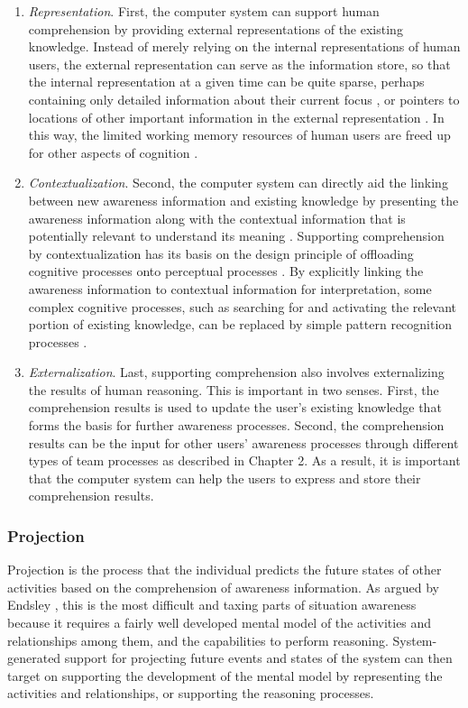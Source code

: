 \begin{enumerate}
	\item \emph{Representation}. First, the computer system can support human comprehension by providing external representations of the existing knowledge. Instead of merely relying on the internal representations of human users, the external representation can serve as the information store, so that the internal representation at a given time can be quite sparse, perhaps containing only detailed information about their current focus \cite{Hegarty2011}, or pointers to locations of other important information in the external representation \cite{M.1996}. In this way, the limited working memory resources of human users are freed up for other aspects of cognition \cite{M.1996}.
	\item \emph{Contextualization}. Second, the computer system can directly aid the linking between new awareness information and existing knowledge by presenting the awareness information along with the contextual information that is potentially relevant to understand its meaning \cite{Tomaszewski2010}. Supporting comprehension by contextualization has its basis on the design principle of offloading cognitive processes onto perceptual processes \cite{M.1996}. By explicitly linking the awareness information to contextual information for interpretation, some complex cognitive processes, such as searching for and activating the relevant portion of existing knowledge, can be replaced by simple pattern recognition processes \cite{Hegarty2011}. 
	\item \emph{Externalization}. Last, supporting comprehension also involves externalizing the results of human reasoning. This is important in two senses. First, the comprehension results is used to update the user's existing knowledge that forms the basis for further awareness processes. Second, the comprehension results can be the input for other users' awareness processes through different types of team processes as described in Chapter 2. As a result, it is important that the computer system can help the users to express and store their comprehension results.
\end{enumerate}

\subsubsection*{Projection} %
\label{ssub:projection}
Projection is the process that the individual predicts the future states of other activities based on the comprehension of awareness information. As argued by Endsley \cite{Endsley1995}, this is the most difficult and taxing parts of situation awareness because it requires a fairly well developed mental model of the activities and relationships among them, and the capabilities to perform reasoning. System-generated support for projecting future events and states of the system can then target on supporting the development of the mental model by representing the activities and relationships, or supporting the reasoning processes. 

